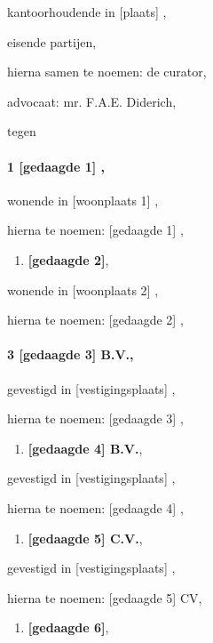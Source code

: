 \documentclass[
  dutch,
  a4paper,
]{article}
\providecommand{\tightlist}{%
  \setlength{\itemsep}{0pt}\setlength{\parskip}{0pt}}
\begin{document}
kantoorhoudende in {[}plaats{]} ,

eisende partijen,

hierna samen te noemen: de curator,

advocaat: mr. F.A.E. Diderich,

tegen

\paragraph{1 {[}gedaagde 1{]} ,}\label{gedaagde-1}

wonende in {[}woonplaats 1{]} ,

hierna te noemen: {[}gedaagde 1{]} ,

\begin{enumerate}
\def\labelenumi{\arabic{enumi}.}
\setcounter{enumi}{1}
\tightlist
\item
  \textbf{{[}gedaagde 2{]}},
\end{enumerate}

wonende in {[}woonplaats 2{]} ,

hierna te noemen: {[}gedaagde 2{]} ,

\paragraph{3 {[}gedaagde 3{]} B.V.,}\label{gedaagde-3-b.v.}

gevestigd in {[}vestigingsplaats{]} ,

hierna te noemen: {[}gedaagde 3{]} ,

\begin{enumerate}
\def\labelenumi{\arabic{enumi}.}
\setcounter{enumi}{3}
\tightlist
\item
  \textbf{{[}gedaagde 4{]} B.V.},
\end{enumerate}

gevestigd in {[}vestigingsplaats{]} ,

hierna te noemen: {[}gedaagde 4{]} ,

\begin{enumerate}
\def\labelenumi{\arabic{enumi}.}
\setcounter{enumi}{4}
\tightlist
\item
  \textbf{{[}gedaagde 5{]} C.V.},
\end{enumerate}

gevestigd in {[}vestigingsplaats{]} ,

hierna te noemen: {[}gedaagde 5{]} CV,

\begin{enumerate}
\def\labelenumi{\arabic{enumi}.}
\setcounter{enumi}{5}
\tightlist
\item
  \textbf{{[}gedaagde 6{]}},
\end{enumerate}
\end{document}
